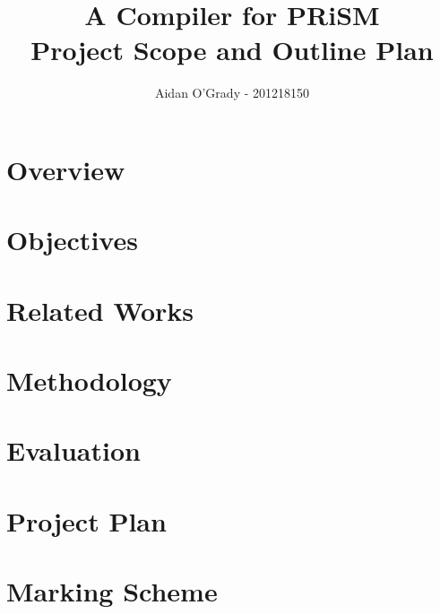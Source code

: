 \documentclass[12pt, a4paper]{article}
\begin{document}
\title{A Compiler for PRiSM \\
\large{Project Scope and Outline Plan}}
\author{Aidan O'Grady - 201218150}
\date{}
\maketitle

\section{Overview} %
\label{sec:overview}


\section{Objectives} %
\label{sec:objectives}


\section{Related Works} %
\label{sec:related_works}


\section{Methodology} %
\label{sec:methodology}


\section{Evaluation} %
\label{sec:evaluation}


\section{Project Plan} %
\label{sec:project_plan}


\section{Marking Scheme} %
\label{sec:marking_scheme}

\end{document}
